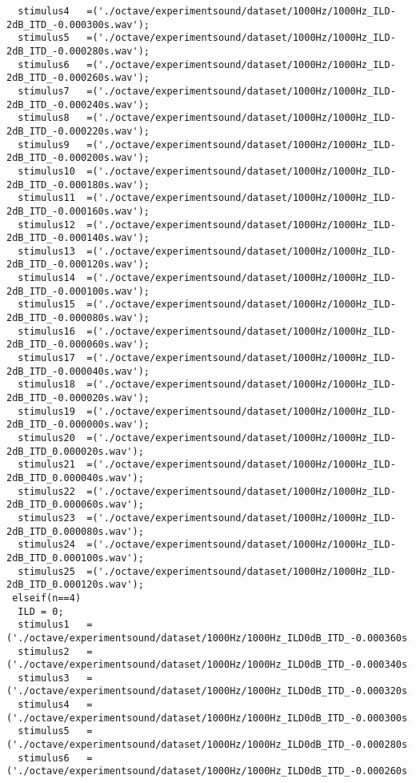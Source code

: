 {\begin{verbatim}
  stimulus4   =('./octave/experimentsound/dataset/1000Hz/1000Hz_ILD-2dB_ITD_-0.000300s.wav');
  stimulus5   =('./octave/experimentsound/dataset/1000Hz/1000Hz_ILD-2dB_ITD_-0.000280s.wav');
  stimulus6   =('./octave/experimentsound/dataset/1000Hz/1000Hz_ILD-2dB_ITD_-0.000260s.wav');
  stimulus7   =('./octave/experimentsound/dataset/1000Hz/1000Hz_ILD-2dB_ITD_-0.000240s.wav');
  stimulus8   =('./octave/experimentsound/dataset/1000Hz/1000Hz_ILD-2dB_ITD_-0.000220s.wav');
  stimulus9   =('./octave/experimentsound/dataset/1000Hz/1000Hz_ILD-2dB_ITD_-0.000200s.wav');
  stimulus10  =('./octave/experimentsound/dataset/1000Hz/1000Hz_ILD-2dB_ITD_-0.000180s.wav');
  stimulus11  =('./octave/experimentsound/dataset/1000Hz/1000Hz_ILD-2dB_ITD_-0.000160s.wav');
  stimulus12  =('./octave/experimentsound/dataset/1000Hz/1000Hz_ILD-2dB_ITD_-0.000140s.wav');
  stimulus13  =('./octave/experimentsound/dataset/1000Hz/1000Hz_ILD-2dB_ITD_-0.000120s.wav');
  stimulus14  =('./octave/experimentsound/dataset/1000Hz/1000Hz_ILD-2dB_ITD_-0.000100s.wav');
  stimulus15  =('./octave/experimentsound/dataset/1000Hz/1000Hz_ILD-2dB_ITD_-0.000080s.wav');
  stimulus16  =('./octave/experimentsound/dataset/1000Hz/1000Hz_ILD-2dB_ITD_-0.000060s.wav');
  stimulus17  =('./octave/experimentsound/dataset/1000Hz/1000Hz_ILD-2dB_ITD_-0.000040s.wav');
  stimulus18  =('./octave/experimentsound/dataset/1000Hz/1000Hz_ILD-2dB_ITD_-0.000020s.wav');
  stimulus19  =('./octave/experimentsound/dataset/1000Hz/1000Hz_ILD-2dB_ITD_-0.000000s.wav');
  stimulus20  =('./octave/experimentsound/dataset/1000Hz/1000Hz_ILD-2dB_ITD_0.000020s.wav');
  stimulus21  =('./octave/experimentsound/dataset/1000Hz/1000Hz_ILD-2dB_ITD_0.000040s.wav');
  stimulus22  =('./octave/experimentsound/dataset/1000Hz/1000Hz_ILD-2dB_ITD_0.000060s.wav');
  stimulus23  =('./octave/experimentsound/dataset/1000Hz/1000Hz_ILD-2dB_ITD_0.000080s.wav');
  stimulus24  =('./octave/experimentsound/dataset/1000Hz/1000Hz_ILD-2dB_ITD_0.000100s.wav');
  stimulus25  =('./octave/experimentsound/dataset/1000Hz/1000Hz_ILD-2dB_ITD_0.000120s.wav');
 elseif(n==4)
  ILD = 0;
  stimulus1   =('./octave/experimentsound/dataset/1000Hz/1000Hz_ILD0dB_ITD_-0.000360s.wav');
  stimulus2   =('./octave/experimentsound/dataset/1000Hz/1000Hz_ILD0dB_ITD_-0.000340s.wav');
  stimulus3   =('./octave/experimentsound/dataset/1000Hz/1000Hz_ILD0dB_ITD_-0.000320s.wav');
  stimulus4   =('./octave/experimentsound/dataset/1000Hz/1000Hz_ILD0dB_ITD_-0.000300s.wav');
  stimulus5   =('./octave/experimentsound/dataset/1000Hz/1000Hz_ILD0dB_ITD_-0.000280s.wav');
  stimulus6   =('./octave/experimentsound/dataset/1000Hz/1000Hz_ILD0dB_ITD_-0.000260s.wav');

\end{verbatim}}
